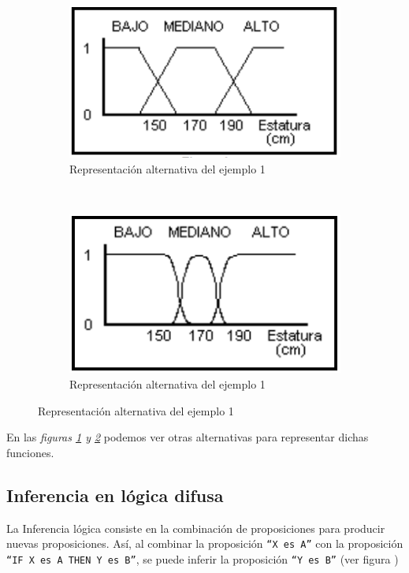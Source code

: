 \begin{figure}[H]
	\centering
	\begin{subfigure}[b]{0.4\textwidth}
		\centering
		\includegraphics[scale = 0.5]{images/fuzzy_example_alt1.png}
		\caption{Representación alternativa del ejemplo 1}
		\label{fig:fuzzy1}
	\end{subfigure}
	~ %
	\begin{subfigure}[b]{0.4\textwidth}
		\centering
		\includegraphics[scale = 0.5]{images/fuzzy_example_alt2.png}
		\caption{Representación alternativa del ejemplo 1}
		\label{fig:fuzzy2}
	\end{subfigure}
	\label{fig:alternativas}	
\end{figure}
En las \textit{figuras \ref{fig:fuzzy1} y \ref{fig:fuzzy2}} podemos ver otras alternativas para representar dichas funciones.

\subsection{Inferencia en lógica difusa}
La Inferencia lógica consiste en la combinación de proposiciones para
producir nuevas proposiciones. Así, al combinar la proposición \texttt{``X es A''} con
la proposición \texttt{``IF X es A THEN Y es B''}, se puede inferir la proposición \texttt{``Y es
B''} (ver figura )

